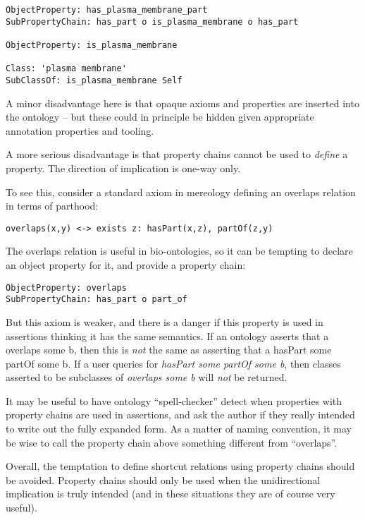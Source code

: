 \documentclass{llncs}
\begin{document}
\begin{verbatim}
ObjectProperty: has_plasma_membrane_part 
SubPropertyChain: has_part o is_plasma_membrane o has_part

ObjectProperty: is_plasma_membrane

Class: 'plasma membrane'
SubClassOf: is_plasma_membrane Self
\end{verbatim}

A minor disadvantage here is that opaque axioms and properties are
inserted into the ontology -- but these could in principle be hidden
given appropriate annotation properties and tooling.

A more serious disadvantage is that property chains cannot be used to
\emph{define} a property. The direction of implication is one-way
only.

To see this, consider a standard axiom in mereology defining an
overlaps relation in terms of parthood:

\begin{verbatim}
overlaps(x,y) <-> exists z: hasPart(x,z), partOf(z,y)
\end{verbatim}

The overlaps relation is useful in bio-ontologies\cite{dahdul2009}, so
it can be tempting to declare an object property for it, and provide a
property chain:

\begin{verbatim}
ObjectProperty: overlaps
SubPropertyChain: has_part o part_of
\end{verbatim}

But this axiom is weaker, and there is a danger if this property is
used in assertions thinking it has the same semantics. If an ontology
asserts that a overlaps some b, then this is \emph{not} the same as
asserting that a hasPart some partOf some b. If a user queries for
\emph{hasPart some partOf some b}, then classes asserted to be
subclasses of \emph{overlaps some b} will \emph{not} be returned.

It may be useful to have ontology ``spell-checker'' detect when
properties with property chains are used in assertions, and ask the
author if they really intended to write out the fully expanded
form. As a matter of naming convention, it may be wise to call the
property chain above something different from ``overlaps''.

Overall, the temptation to define shortcut relations using property
chains should be avoided. Property chains should only be used when the
unidirectional implication is truly intended (and in these situations
they are of course very useful).
\end{document}
